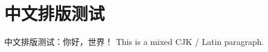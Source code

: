 \documentclass{ctexart}
\begin{document}
\section{中文排版测试}
中文排版测试：你好，世界！
This is a mixed CJK / Latin paragraph.
\end{document}
